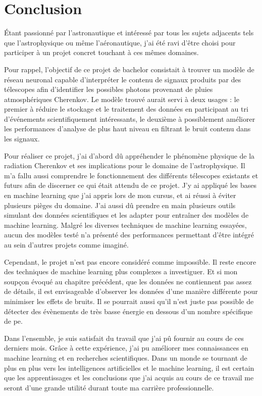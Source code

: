 \chapter*{Conclusion}


Étant passionné par l'astronautique et intéressé par tous les sujets adjacents tels que l'astrophysique ou même l'aéronautique, 
j'ai été ravi d'être choisi pour participer à un projet concret touchant à ces mêmes domaines.

Pour rappel, l'objectif de ce projet de bachelor consistait à trouver un modèle de réseau neuronal capable d'interpréter 
le contenu de signaux produits par des télescopes afin d'identifier les possibles photons provenant de pluies atmosphériques Cherenkov.
Le modèle trouvé aurait servi à deux usages : le premier à réduire le stockage et le traitement des données en participant 
au tri d'événements scientifiquement intéressants, le deuxième à possiblement améliorer les performances d'analyse de plus haut niveau 
en filtrant le bruit contenu dans les signaux. 

Pour réaliser ce projet, j'ai d'abord dû appréhender le phénomène physique de la radiation Cherenkov et ses implications pour le domaine de l'astrophysique.
Il m'a fallu aussi comprendre le fonctionnement des différents télescopes existants et futurs afin de discerner 
ce qui était attendu de ce projet. J'y ai appliqué les bases en machine learning que j'ai appris lors de mon cursus, et ai 
réussi à éviter plusieurs pièges du domaine. J'ai aussi dû prendre en main plusieurs outils simulant des données scientifiques et les adapter
pour entraîner des modèles de machine learning. Malgré les diverses techniques de machine learning essayées,
aucun des modèles testé n'a présenté des performances permettant d'être intégré au sein d'autres projets comme imaginé.

Cependant, le projet n'est pas encore considéré comme impossible. Il reste encore des techniques de machine learning plus complexes a investiguer. 
Et si mon soupçon évoqué au chapitre précédent, que les données ne contiennent pas assez de détails, il est envisageable d'observer
les données d'une manière différente pour minimiser les effets de bruits. Il se pourrait aussi qu'il n'est juste pas possible de détecter
des évènements de très basse énergie en dessous d'un nombre spécifique de \gls{pe}.

Dans l'ensemble, je suis satisfait du travail que j'ai pû fournir au cours de ces derniers mois.
Grâce à cette expérience, j'ai pu améliorer mes connaissances en machine learning et en recherches scientifiques.
Dans un monde se tournant de plus en plus vers les intelligences artificielles et le machine learning,
il est certain que les apprentissages et les conclusions que j'ai acquis au cours de ce travail me seront d'une 
grande utilité durant toute ma carrière professionnelle.